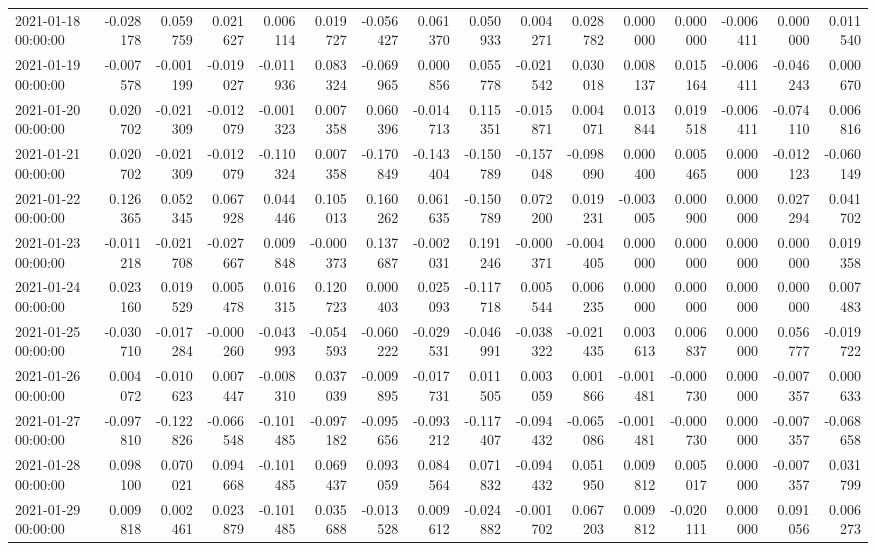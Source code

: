 \begin{tabular}{lrrrrrrrrrrrrrrr}
2021-01-18 00:00:00 & -0.028178 & 0.059759 & 0.021627 & 0.006114 & 0.019727 & -0.056427 & 0.061370 & 0.050933 & 0.004271 & 0.028782 & 0.000000 & 0.000000 & -0.006411 & 0.000000 & 0.011540 \\
2021-01-19 00:00:00 & -0.007578 & -0.001199 & -0.019027 & -0.011936 & 0.083324 & -0.069965 & 0.000856 & 0.055778 & -0.021542 & 0.030018 & 0.008137 & 0.015164 & -0.006411 & -0.046243 & 0.000670 \\
2021-01-20 00:00:00 & 0.020702 & -0.021309 & -0.012079 & -0.001323 & 0.007358 & 0.060396 & -0.014713 & 0.115351 & -0.015871 & 0.004071 & 0.013844 & 0.019518 & -0.006411 & -0.074110 & 0.006816 \\
2021-01-21 00:00:00 & 0.020702 & -0.021309 & -0.012079 & -0.110324 & 0.007358 & -0.170849 & -0.143404 & -0.150789 & -0.157048 & -0.098090 & 0.000400 & 0.005465 & 0.000000 & -0.012123 & -0.060149 \\
2021-01-22 00:00:00 & 0.126365 & 0.052345 & 0.067928 & 0.044446 & 0.105013 & 0.160262 & 0.061635 & -0.150789 & 0.072200 & 0.019231 & -0.003005 & 0.000900 & 0.000000 & 0.027294 & 0.041702 \\
2021-01-23 00:00:00 & -0.011218 & -0.021708 & -0.027667 & 0.009848 & -0.000373 & 0.137687 & -0.002031 & 0.191246 & -0.000371 & -0.004405 & 0.000000 & 0.000000 & 0.000000 & 0.000000 & 0.019358 \\
2021-01-24 00:00:00 & 0.023160 & 0.019529 & 0.005478 & 0.016315 & 0.120723 & 0.000403 & 0.025093 & -0.117718 & 0.005544 & 0.006235 & 0.000000 & 0.000000 & 0.000000 & 0.000000 & 0.007483 \\
2021-01-25 00:00:00 & -0.030710 & -0.017284 & -0.000260 & -0.043993 & -0.054593 & -0.060222 & -0.029531 & -0.046991 & -0.038322 & -0.021435 & 0.003613 & 0.006837 & 0.000000 & 0.056777 & -0.019722 \\
2021-01-26 00:00:00 & 0.004072 & -0.010623 & 0.007447 & -0.008310 & 0.037039 & -0.009895 & -0.017731 & 0.011505 & 0.003059 & 0.001866 & -0.001481 & -0.000730 & 0.000000 & -0.007357 & 0.000633 \\
2021-01-27 00:00:00 & -0.097810 & -0.122826 & -0.066548 & -0.101485 & -0.097182 & -0.095656 & -0.093212 & -0.117407 & -0.094432 & -0.065086 & -0.001481 & -0.000730 & 0.000000 & -0.007357 & -0.068658 \\
2021-01-28 00:00:00 & 0.098100 & 0.070021 & 0.094668 & -0.101485 & 0.069437 & 0.093059 & 0.084564 & 0.071832 & -0.094432 & 0.051950 & 0.009812 & 0.005017 & 0.000000 & -0.007357 & 0.031799 \\
2021-01-29 00:00:00 & 0.009818 & 0.002461 & 0.023879 & -0.101485 & 0.035688 & -0.013528 & 0.009612 & -0.024882 & -0.001702 & 0.067203 & 0.009812 & -0.020111 & 0.000000 & 0.091056 & 0.006273 \\

\end{tabular}

